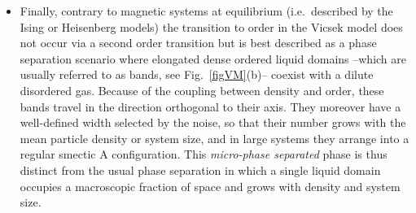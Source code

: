 \begin{itemize}
Another peculiar feature of the ordered phase can be found measuring the statistics of the number of particle $n(t) \equiv \int_{\cal V}{\rm d}\bm r \, \sum_i \delta(\bm r - \bm r_i^t)$ into a sub-domain of volume $\cal V$.
Namely, measuring the mean and variance of $n$ in domains of increasing sizes one finds that
\begin{equation}
\langle \Delta n^2 \rangle_t \sim \langle n \rangle_t^\phi ,
\end{equation}
with $\phi \simeq 1.6$ (see Fig.~\ref{figVM}(c))~\cite{chate2020dry}. 
In a system with `normal' density fluctuations, the law of large number would impose that $\phi = 1$. 
Here, however, $\phi > 1$, i.e.\ the variance of $n$ grows faster than its mean, 
so that density fluctuations in the homogeneous ordered phase are deemed as `anomalous', or `giant'\footnote{Note that these giant density fluctuations are not related to any clustering phenomenon (e.g.\ like motility induced phase separation),
but instead due to the infinite correlation length of density fluctuations in an overall spatially homogeneous system.}.
\item Finally, contrary to magnetic systems at equilibrium (i.e.\ described by the Ising or Heisenberg models) the transition to order in the Vicsek model does not occur via a second order transition but is best described as a phase separation scenario where elongated dense ordered liquid domains --which are usually referred to as bands, see Fig.~\ref{figVM}(b)-- coexist with a dilute disordered gas.
Because of the coupling between density and order, these bands travel in the direction orthogonal to their axis.
They moreover have a well-defined width selected by the noise, so that their number grows with the mean particle density or system size,
and in large systems they arrange into a regular smectic A configuration.
This {\it micro-phase separated} phase is thus distinct from the usual phase separation in which a single liquid domain occupies a macroscopic fraction of space and grows with density and system size.
\end{itemize}

